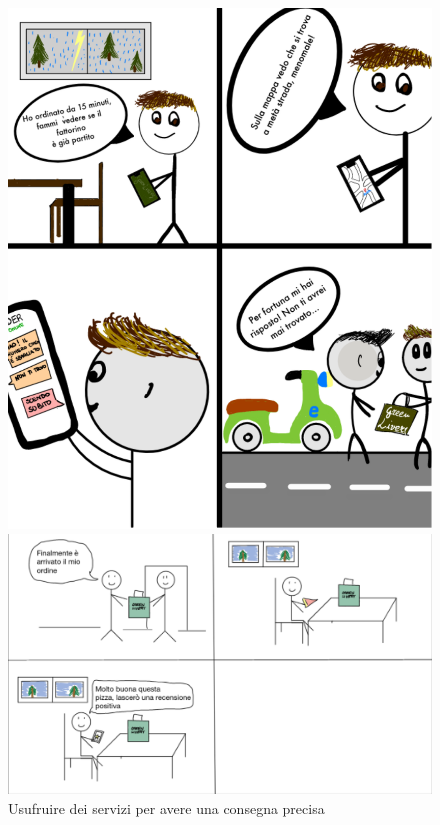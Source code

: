\documentclass{article}
\begin{document}
\begin{figure}[htpb]
\begin{minipage}{0.40\textwidth}
    \includegraphics[width = \textwidth]{Data/StoryBoard/risoluzione disguidi alla cosegna.png}
    \caption[Seconda figura]{Usufruire dei servizi per avere una consegna precisa}\label{fig:2}
\end{minipage}
\begin{minipage}{0.40\textwidth}
    \includegraphics[width=\textwidth]{Data/StoryBoard/Recensione_ristorante.png}

\end{minipage}
\end{figure}
\end{document}
